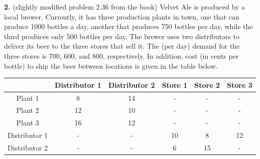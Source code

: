 \documentclass[11pt]{article}
\theoremstyle{definition}
\begin{document}
\newpage

\textbf{2.} (slightly modified problem 2.36 from the book) Velvet Ale is produced by a local brewer. Currently, it has three production plants in town, one that can produce 1000 bottles a day, another that produces 750 bottles per day, while the third produces only 500 bottles per day. The brewer uses two distributors to deliver its beer to the three stores that sell it. The (per day) demand for the three stores is 700, 600, and 800, respectively. In addition, cost (in cents per bottle) to ship the beer between locations is given in the table below.

\begin{center}
\begin{tabular}{c|ccccc} \hline
& Distributor 1 & Distributor 2 & Store 1 & Store 2 & Store 3 \\ \hline
Plant 1 & 8 & 14 & - & - & - \\
Plant 2 & 12 & 10 & - & - & - \\
Plant 3 & 16 & 12 & - & - & - \\
Distributor 1 & - & - & 10 & 8 &  12 \\
Distributor 2 & - & - & 6 & 15 & - \\ \hline
\end{tabular}

\end{center}
\end{document}
